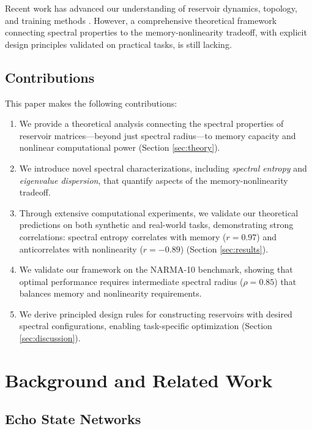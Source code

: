 \documentclass{article}
\begin{document}
Recent work has advanced our understanding of reservoir dynamics, topology, and training methods \citep{hart2021thesis,lukovsevivcius2012}. However, a comprehensive theoretical framework connecting spectral properties to the memory-nonlinearity tradeoff, with explicit design principles validated on practical tasks, is still lacking.

\subsection{Contributions}

This paper makes the following contributions:

\begin{enumerate}
    \item We provide a theoretical analysis connecting the spectral properties of reservoir matrices—beyond just spectral radius—to memory capacity and nonlinear computational power (Section \ref{sec:theory}).
    
    \item We introduce novel spectral characterizations, including \textit{spectral entropy} and \textit{eigenvalue dispersion}, that quantify aspects of the memory-nonlinearity tradeoff.
    
    \item Through extensive computational experiments, we validate our theoretical predictions on both synthetic and real-world tasks, demonstrating strong correlations: spectral entropy correlates with memory ($r=0.97$) and anticorrelates with nonlinearity ($r=-0.89$) (Section \ref{sec:results}).
    
    \item We validate our framework on the NARMA-10 benchmark, showing that optimal performance requires intermediate spectral radius ($\rho=0.85$) that balances memory and nonlinearity requirements.
    
    \item We derive principled design rules for constructing reservoirs with desired spectral configurations, enabling task-specific optimization (Section \ref{sec:discussion}).
\end{enumerate}

\section{Background and Related Work}
\label{sec:background}

\subsection{Echo State Networks}
\end{document}
